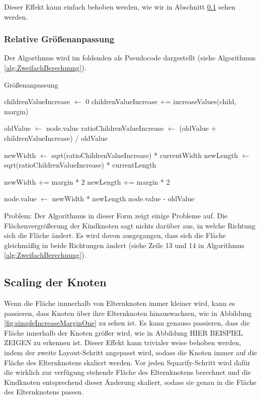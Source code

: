 Dieser Effekt kann einfach behoben werden, wie wir in Abschnitt \ref{sec:ScalingKnoten} sehen werden.

\subsubsection{Relative Größenanpassung}

Der Algorthmus wird im foldenden als Pseudocode dargestellt (siehe Algorithmus \ref{alg:ZweifachBerechnung}). 

\begin{algorithm}[H]
\caption{Größenanpassung}
\label{alg:ZweifachBerechnung}
\begin{algorithmic}[1]
        \State {}
    \EndIf

    \State childrenValueIncrease $\gets$ 0
            \State childrenValueIncrease += increaseValues(child, margin)
        \EndFor
    \EndIf

    \State oldValue $\gets$ node.value
    \State ratioChildrenValueIncrease $\gets$ (oldValue + childrenValueIncrease) / oldValue

    \State newWidth $\gets$ sqrt(ratioChildrenValueIncrease) * currentWidth
    \State newLength $\gets$ sqrt(ratioChildrenValueIncrease) * currentLength

    \State newWidth += margin * 2
    \State newLength += margin * 2

    \State node.value $\gets$ newWidth * newLength
    \State \Return node.value - oldValue
\EndFunction
\end{algorithmic}
\end{algorithm}

Problem:
Der Algorithmus in dieser Form zeigt einige Probleme auf. Die Flächenvergrößerung der Kindknoten sagt nichts darüber aus, in welche Richtung sich die Fläche ändert. Es wird davon ausgegangen, dass sich die Fläche gleichmäßig in beide Richtungen ändert (siehe Zeile 13 und 14 in Algorithmus \ref{alg:ZweifachBerechnung}). 

\subsection{Scaling der Knoten} \label{sec:ScalingKnoten}
Wenn die Fläche innnerhalb von Elternknoten immer kleiner wird, kann es passieren, dass Knoten über ihre Elternknoten hinauswachsen, wie in Abbildung \ref{fig:simpleIncreaseMarginOne} zu sehen ist. Es kann genauso passieren, dass die Fläche innerhalb der Knoten größer wird, wie in Abbildung HIER BEISPIEL ZEIGEN zu erkennen ist. Dieser Effekt kann trivialer weise behoben werden, indem der zweite Layout-Schritt angepasst wird, sodass die Knoten immer auf die Fläche des Elternknotens skaliert werden. 
Vor jeden Squarify-Schritt wird dafür die wirklich zur verfügung stehende Fläche des Elternknotens berechnet und die Kindknoten entsprechend dieser Änderung skaliert, sodass sie genau in die Fläche des Elternknotens passen.


